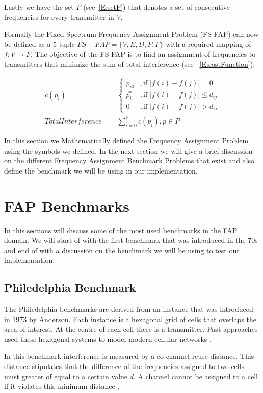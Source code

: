 Lastly we have the set $F$ (see~\ref{E:setF}) that denotes a set of consecutive frequencies for every transmitter in $V$\cite{FAPOrientationModel,TabuMontemanniSmith}.

Formally the Fixed Spectrum Frequency Assignment Problem (FS-FAP) can now be defined as a 5-tuple \(FS-FAP = \{V,E,D,P,F\}\) with a required mapping of \(f: V \rightarrow F\)\cite{TabuMontemanniSmith}. The objective of the FS-FAP is to find an assignment of frequencies to transmitters that minimize the sum of total interference (see ~\ref{E:costFunction}).

\begin{align} 
 c(p_i) &= 
 \begin{cases}
	\bar{p_{i0}} &,\text{if $|f(i) - f(j)| = 0$}\\
	\overset{=}{p_{i1}} &, \text{if $|f(i) - f(j)| \leqslant d_{ij}$}\\
	0 &,\text{if $|f(i) - f(j)| > d_{ij}$}
 \end{cases}\\
 \label{E:costFunction}
 Total Interference &= \sum^\mathbb{P}_{i = 0}c(p_i),p \in P 
\end{align}

In this section we Mathematically defined the Frequency Assignment Problem using the symbols we defined. In the next section we will give a brief discussion on the different Frequency Assignment Benchmark Problems that exist and also define the benchmark we will be using in our implementation.
\section{FAP Benchmarks}
\label{sec:FAPBenchmarks}
In this sections will discuss some of the most used benchmarks in the FAP domain. We will start of with the first benchmark that was introduced in the 70s and end of with a discussion on the benchmark we will be using to test our implementation.
\subsection{Philedelphia Benchmark}
The Philedelphia benchmarks are derived from an instance that was introduced in 1973 by Anderson. Each instance is a hexagonal grid of cells that overlaps the area of interest. At the centre of each cell there is a transmitter. Past approaches used these hexagonal systems to model modern cellular networks \cite{Karen2004,ExactMIFAP}.

In this benchmark interference is measured by a co-channel reuse distance. This distance stipulates that the difference of the frequencies  assigned to two cells must greater of equal to a certain value $d$. A channel cannot be assigned to a cell if it violates this minimum distance \cite{Karen2004,ExactMIFAP}.

